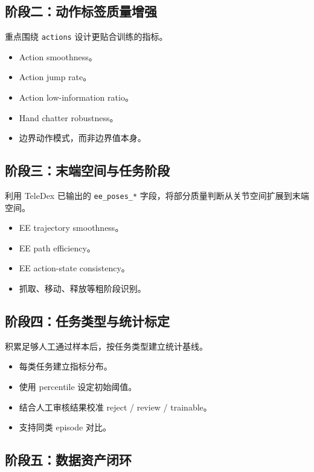 \documentclass[UTF8,zihao=-4]{ctexart}
\begin{document}
\subsection{阶段二：动作标签质量增强}

重点围绕 \texttt{actions} 设计更贴合训练的指标。

\begin{itemize}
  \item Action smoothness。
  \item Action jump rate。
  \item Action low-information ratio。
  \item Hand chatter robustness。
  \item 边界动作模式，而非边界值本身。
\end{itemize}

\subsection{阶段三：末端空间与任务阶段}

利用 TeleDex 已输出的 \texttt{ee\_poses\_*} 字段，将部分质量判断从关节空间扩展到末端空间。

\begin{itemize}
  \item EE trajectory smoothness。
  \item EE path efficiency。
  \item EE action-state consistency。
  \item 抓取、移动、释放等粗阶段识别。
\end{itemize}

\subsection{阶段四：任务类型与统计标定}

积累足够人工通过样本后，按任务类型建立统计基线。

\begin{itemize}
  \item 每类任务建立指标分布。
  \item 使用 percentile 设定初始阈值。
  \item 结合人工审核结果校准 reject / review / trainable。
  \item 支持同类 episode 对比。
\end{itemize}

\subsection{阶段五：数据资产闭环}
\end{document}
